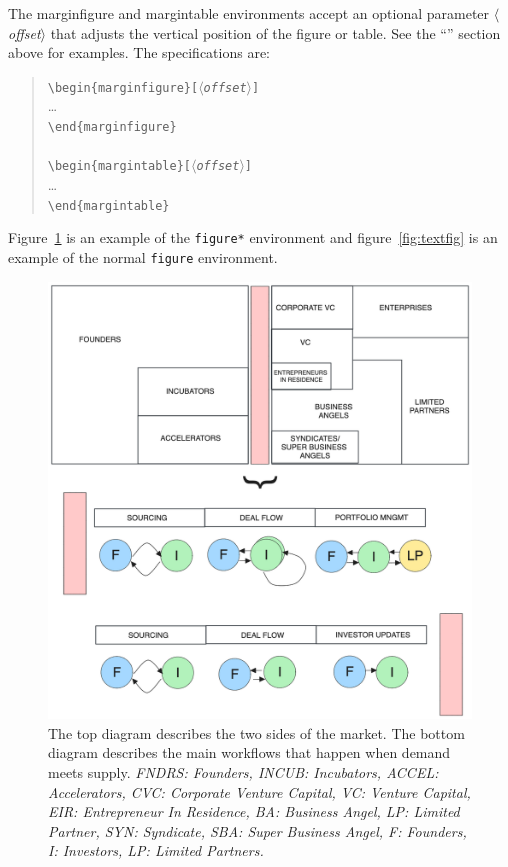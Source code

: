 \documentclass{tufte-handout}
\newcommand{\doccmd}[1]{\texttt{\textbackslash#1}}%
\newcommand{\docopt}[1]{\ensuremath{\langle}\textrm{\textit{#1}}\ensuremath{\rangle}}%
\newcommand{\docenv}[1]{\textsf{#1}}%
\newenvironment{docspec}{\begin{quote}\noindent}{\end{quote}}%
\begin{document}
The \docenv{marginfigure} and \docenv{margintable} environments accept an optional parameter \docopt{offset} that adjusts the vertical position of the figure or table.  See the ``'' section above for examples.  The specifications are:
\begin{docspec}
  \doccmd{begin\{marginfigure\}[\docopt{offset}]}\\
  \qquad\ldots\\
  \doccmd{end\{marginfigure\}}\\
  \mbox{}\\
  \doccmd{begin\{margintable\}[\docopt{offset}]}\\
  \qquad\ldots\\
  \doccmd{end\{margintable\}}\\
\end{docspec}

Figure~\ref{fig:fullfig} is an example of the \Verb|figure*|
environment and figure~\ref{fig:textfig} is an example of the normal
\Verb|figure| environment.

\begin{figure}[h]
  \includegraphics[width=\linewidth]{Fig-ecosystem-Drawing 2023-11-13 10.49.35.excalidraw.png}%
  \caption{The top diagram describes the two sides of the market. The bottom diagram describes the main workflows that 
  happen when demand meets supply.
  \emph{FNDRS: Founders, INCUB: Incubators, ACCEL: Accelerators, CVC: Corporate Venture Capital, VC: Venture Capital, 
  EIR: Entrepreneur In Residence, BA: Business Angel, LP: Limited Partner, SYN: Syndicate, SBA: Super Business Angel, 
  F: Founders, I: Investors, LP: Limited Partners.}}
  \label{fig:fullfig}%
\end{figure}
\end{document}

